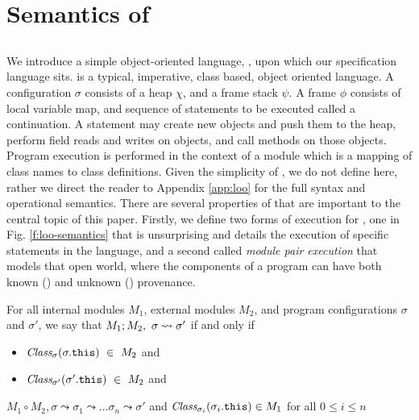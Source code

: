 \section{Semantics of \Chainmail}
\label{s:semantics}

\subsection{\Loo}
We introduce a simple object-oriented language, \Loo, upon 
which our specification language sits. \Loo is a typical, imperative,
class based, object oriented language. A \Loo configuration $\sigma$ consists of a 
heap $\chi$, and a frame stack $\psi$. A frame $\phi$ consists of
local variable map, and sequence of statements to be executed called 
a continuation. A statement may create new objects and push them to the heap, 
perform field reads and writes on objects, and call methods on those objects. 
Program execution is performed in the context of a module which is a mapping
of class names to class definitions. Given the simplicity of \Loo, we do not
define \Loo here, rather we direct the reader to Appendix \ref{app:loo} for 
the full syntax and operational semantics. There are several properties 
of \Loo that are important to the central topic of this paper. Firstly,
we define two forms of execution for \Loo, one in Fig. \ref{f:loo-semantics}
that is unsurprising and details the execution of specific 
statements in the language, and a second called \emph{module pair execution} 
that models that open world, where the components of a program can
have both known (\internalO) and unknown (\externalO) provenance.
\begin{definition}
\label{def:pair-reduce}
For all internal modules $M_1$, external modules $M_2$, and program configurations $\sigma$ and $\sigma'$, 
we say that $M_1 ; M_2,\ \sigma \leadsto \sigma'$ if and only if
\begin{itemize}
\item
$\class{\sigma}{\sigma.\texttt{this}}\ \in\ M_2$ and
\item
$\class{\sigma'}{\sigma'.\texttt{this}}\ \in\ M_2$ and 
\end{itemize} 
$M_1 \circ M_2, \sigma \leadsto \sigma_1 \leadsto \ldots \sigma_n \leadsto \sigma'$ and $\textit{Class}_{\sigma_i}(\sigma_i.\texttt{this}) \in M_1$ for all $0 \leq i \leq n$
\end{definition}
